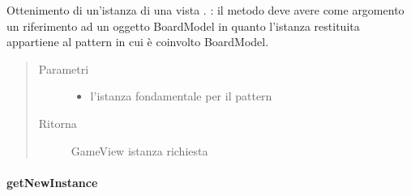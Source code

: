 \documentclass[letterpaper,10pt,italian,openany,oneside]{sphinxmanual}
\begin{document}
\begin{fulllineitems}
\label{\detokenize{source/it/unicam/cs/pa/mastermind/factories/GameViewFactory:it.unicam.cs.pa.mastermind.factories.GameViewFactory.getGameView(BoardModel)}}
Ottenimento di un’istanza di una vista . : il metodo deve avere come argomento un riferimento ad un oggetto BoardModel in quanto l’istanza restituita appartiene al pattern  in cui è coinvolto BoardModel.
\begin{quote}\begin{description}
\item[{Parametri}] \leavevmode\begin{itemize}
\item {} 
 \textendash{} l’istanza fondamentale per il pattern 

\end{itemize}

\item[{Ritorna}] \leavevmode
GameView istanza richiesta

\end{description}\end{quote}

\end{fulllineitems}



\paragraph{getNewInstance}
\label{\detokenize{source/it/unicam/cs/pa/mastermind/factories/GameViewFactory:getnewinstance}}
\end{document}

